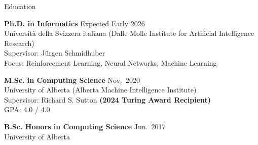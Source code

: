 \documentclass{cv}
\begin{document}

\begin{rSection}{Education}

{\bf Ph.D. in Informatics} \hfill Expected Early 2026 \vspace{0.05em}\\
Universit{\`{a}} della Svizzera italiana (Dalle Molle Institute for Artificial Intelligence Research) \vspace{0.05em}\\
Supervisor: J{\"u}rgen Schmidhuber \vspace{0.05em}\\
Focus: Reinforcement Learning, Neural Networks, Machine Learning


{\bf M.Sc. in Computing Science} \hfill Nov.\ 2020 \vspace{0.05em}\\
University of Alberta (Alberta Machine Intelligence Institute) \vspace{0.05em}\\
Supervisor: Richard S. Sutton \textbf{(2024 Turing Award Recipient)} \vspace{0.05em}\\
GPA: 4.0 / 4.0


{\bf B.Sc. Honors in Computing Science} \hfill Jun.\ 2017 \vspace{0.05em}\\
University of Alberta

\end{rSection}

\end{document}
